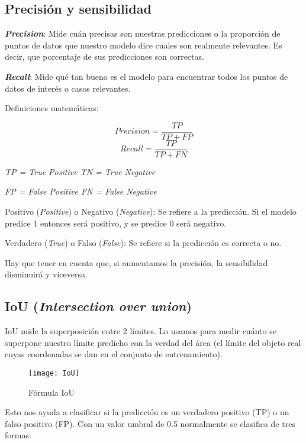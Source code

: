 \subsection{Precisión y sensibilidad}

\textbf{\textit{Precision}}: Mide cuán precisas son nuestras predicciones o la proporción de puntos de datos que nuestro modelo dice cuales son realmente relevantes. Es decir, que porcentaje de sus predicciones son correctas.

\textbf{\textit{Recall}}: Mide qué tan bueno es el modelo para encuentrar todos los puntos de datos de interés o casos relevantes.

Definiciones matemáticas:

\[Precision = \frac{TP}{TP + FP}\] \[Recall = \frac{TP}{TP + FN}\]

\begin{center}
    \textit{TP = True Positive      TN = True Negative}
    
    \textit{FP = False Positive      FN = False Negative}
\end{center}

Positivo (\textit{Positive}) o Negativo (\textit{Negative}): Se refiere a la predicción. Si el modelo predice 1 entonces será positivo, y se predice 0 será negativo.

Verdadero (\textit{True}) o Falso (\textit{False}): Se refiere si la predicción es correcta o no.

Hay que tener en cuenta que, si aumentamos la precisión, la sensibilidad disminuirá y viceversa.

\subsection{IoU (\textit{Intersection over union})}

IoU mide la superposición entre 2 límites. Lo usamos para medir cuánto se superpone nuestro límite predicho con la verdad del área (el límite del objeto real cuyas coordenadas se dan en el conjunto de entrenamiento). 

\begin{figure}[htb]
	\centering
	\texttt{[image: IoU]}
	\caption[Fórmula IoU]{Fórmula IoU \cite{AP}}
\end{figure}

Esto nos ayuda a clasificar si la predicción es un verdadero positivo (TP) o un falso positivo (FP). Con un valor umbral de 0.5 normalmente se clasifica de tres formas:

